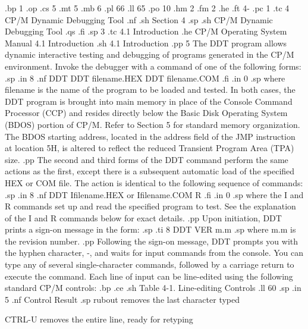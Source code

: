 
.bp 1
.op
.cs 5
.mt 5
.mb 6
.pl 66
.ll 65
.po 10
.hm 2
.fm 2
.he
.ft                                4-%
.pc 1
.tc 4  CP/M Dynamic Debugging Tool
.nf
.sh
                            Section 4
.sp
.sh
                   CP/M Dynamic Debugging Tool
.qs
.fi
.sp 3
.tc    4.1  Introduction
.he CP/M Operating System Manual                    4.1  Introduction
.sh
4.1  Introduction
.pp 5
The DDT program allows dynamic interactive testing and debugging of
programs generated in the CP/M environment.  Invoke the debugger with
a command of one of the following forms:
.sp
.in 8
.nf
DDT
DDT filename.HEX
DDT filename.COM
.fi
.in 0
.sp
where filename is the name of the program to be loaded and 
tested.  In both cases, the DDT program is brought into main 
memory in place of the Console Command Processor (CCP) and resides 
directly below the Basic Disk Operating System (BDOS)
portion of CP/M.  Refer to Section 5 for standard memory
organization.  The BDOS
starting address, located in the address field of the 
JMP instruction at location 5H, is altered to reflect the 
reduced Transient Program Area (TPA) size.
.pp
The second and third forms of the DDT command perform the same 
actions as the first, except there is a subsequent automatic load 
of the specified HEX or COM file.  The action is identical to the 
following sequence of commands:
.sp
.in 8
.nf
DDT
Ifilename.HEX or Ifilename.COM
R
.fi
.in 0
.sp
where the I and R commands set up and read the specified program 
to test.  See the explanation of the I and R 
commands below for exact details.
.pp
Upon initiation, DDT prints a sign-on message in the form:
.sp
.ti 8
DDT VER m.m
.sp
where m.m is the revision number.
.pp
Following the sign-on message, DDT prompts you with the 
hyphen character, -, and waits for input commands from the 
console.  You can type any of several single-character commands, 
followed by a carriage return to execute the command.  Each 
line of input can be line-edited using the following standard 
CP/M controls:
.bp
.ce
.sh
Table 4-1.  Line-editing Controls
.ll 60
.sp
.in 5
.nf
Control                       Result
.sp
rubout      removes the last character typed

CTRL-U      removes the entire line, ready for retyping

